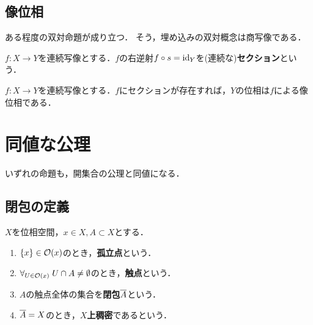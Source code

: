 \documentclass[uplatex,dvipdfmx]{jsreport}
\begin{document}
\subsection{像位相}

\begin{tcolorbox}[colframe=ForestGreen, colback=ForestGreen!10!white,breakable,colbacktitle=ForestGreen!40!white,coltitle=black,fonttitle=\bfseries\sffamily,
title=]
    ある程度の双対命題が成り立つ．
    そう，埋め込みの双対概念は商写像である．
\end{tcolorbox}

\begin{definition}
    $f:X\to Y$を連続写像とする．$f$の右逆射$f\circ s=\mathrm{id}_Y$を(連続な)\textbf{セクション}という．
\end{definition}

\begin{proposition}
    $f:X\to Y$を連続写像とする．$f$にセクションが存在すれば，$Y$の位相は$f$による像位相である．
\end{proposition}

\section{同値な公理}

\begin{tcolorbox}[colframe=ForestGreen, colback=ForestGreen!10!white,breakable,colbacktitle=ForestGreen!40!white,coltitle=black,fonttitle=\bfseries\sffamily,
    title=]
    いずれの命題も，開集合の公理と同値になる．
\end{tcolorbox}

\subsection{閉包の定義}

\begin{definition}
    $X$を位相空間，$x\in X,A\subset X$とする．
    \begin{enumerate}
        \item $\{x\}\in\mathcal{O}(x)$のとき，\textbf{孤立点}という．
        \item $\forall_{U\in\mathcal{O}(x)}\;U\cap A\ne\emptyset$のとき，\textbf{触点}という．
        \item $A$の触点全体の集合を\textbf{閉包}$\overline{A}$という．
        \item $\overline{A}=X$のとき，\textbf{$X$上稠密}であるという．
    \end{enumerate}
\end{definition}
\end{document}
